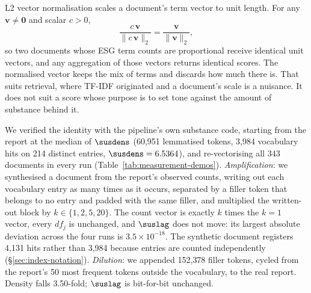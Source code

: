 L2 vector normalisation scales a document's term vector to unit length. For
any $\mathbf{v} \neq \mathbf{0}$ and scalar $c > 0$,
\begin{equation}
\label{eq:l2-invariance}
\frac{c\,\mathbf{v}}{\lVert c\,\mathbf{v}\rVert_2}
= \frac{\mathbf{v}}{\lVert \mathbf{v}\rVert_2},
\end{equation}
so two documents whose ESG term counts are proportional receive identical
unit vectors, and any aggregation of those vectors returns identical scores.
The normalised vector keeps the mix of terms and discards how much there is.
That suits retrieval, where TF-IDF originated
\citep{sparckjones1972,manning2008} and a document's scale is a nuisance. It
does not suit a score whose purpose is to set tone against the amount of
substance behind it.

We verified the identity with the pipeline's own substance code, starting
from the report at the median of $\susdens$ (60{,}951 lemmatised tokens,
3{,}984 vocabulary hits on 214 distinct entries, $\susdens = 6.5364$), and
re-vectorising all 343 documents in every run
(Table~\ref{tab:measurement-demos}). \emph{Amplification}: we synthesised a
document from the report's observed counts, writing out each vocabulary entry
as many times as it occurs, separated by a filler token that belongs to no
entry and padded with the same filler, and multiplied the written-out block by
$k \in \{1, 2, 5, 20\}$. The count vector is exactly $k$ times the $k=1$
vector, every $df_j$ is unchanged, and $\suslag$ does not move: its largest
absolute deviation across the four runs is $3.5 \times 10^{-18}$. The
synthetic document registers 4{,}131 hits rather than 3{,}984 because entries
are counted independently (\S\ref{sec:index-notation}). \emph{Dilution}: we
appended 152{,}378 filler tokens, cycled from the report's 50 most frequent
tokens outside the vocabulary, to the real report. Density falls 3.50-fold;
$\suslag$ is bit-for-bit unchanged.

